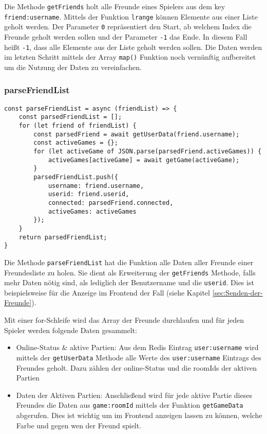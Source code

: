 Die Methode \verb|getFriends| holt alle Freunde eines Spielers aus dem key \verb|friend:username|. Mittels der Funktion \verb|lrange| können Elemente aus einer Liste geholt werden. Der Parameter \verb|0| repräsentiert den Start, ab welchem Index die Freunde geholt werden sollen und der Parameter \verb|-1| das Ende. In diesem Fall heißt \verb|-1|, dass alle Elemente aus der Liste geholt werden sollen. Die Daten werden im letzten Schritt mittels der Array \verb|map()| Funktion noch vernünftig aufbereitet um die Nutzung der Daten zu vereinfachen.

\subsubsection{parseFriendList}
\label{sec:parseFriendList}

\begin{lstlisting}[style=codeStyle, caption={Methode um alle Informationen eines Arrays von Freunden zu bekommen}, label={lst:parseFriendList}]
const parseFriendList = async (friendList) => {
    const parsedFriendList = [];
    for (let friend of friendList) {
        const parsedFriend = await getUserData(friend.username);
        const activeGames = {};
        for (let activeGame of JSON.parse(parsedFriend.activeGames)) {
            activeGames[activeGame] = await getGame(activeGame);
        }
        parsedFriendList.push({
            username: friend.username,
            userid: friend.userid,
            connected: parsedFriend.connected,
            activeGames: activeGames
        });
    }
    return parsedFriendList;
}
\end{lstlisting}

Die Methode \verb|parseFriendList| hat die Funktion alle Daten aller Freunde einer Freundesliste zu holen. Sie dient als Erweiterung der \verb|getFriends| Methode, falls mehr Daten nötig sind, als lediglich der Benutzername und die \verb|userid|. Dies ist beispielsweise für die Anzeige im Frontend der Fall (siehe Kapitel \ref{sec:Senden-der-Freunde}).

Mit einer for-Schleife wird das Array der Freunde durchlaufen und für jeden Spieler werden folgende Daten gesammelt:

\begin{itemize}
\item Online-Status \& aktive Partien: Aus dem Redis Eintrag \verb|user:username| wird mittels der \verb|getUserData| Methode alle Werte des \verb|user:username| Eintrags des Freundes geholt. Dazu zählen der online-Status und die roomIds der aktiven Partien
\item Daten der Aktiven Partien: Anschließend wird für jede aktive Partie dieses Freundes die Daten aus \verb|game:roomId| mittels der Funktion \verb|getGameData| abgerufen. Dies ist wichtig um im Frontend anzeigen lassen zu können, welche Farbe und gegen wen der Freund spielt.

\end{itemize}

